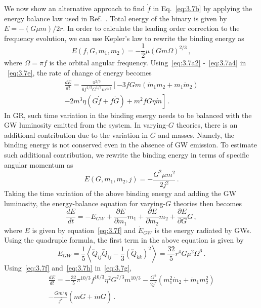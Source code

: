 \documentclass[prd,twocolumn,nofootinbib]{revtex4-1}
\begin{document}
 
We now show an alternative approach to find $\dot f$ in Eq.~\eqref{eq:3.7b} by applying the energy balance law used in Ref.~\cite{Yunes:2009bv}. Total energy of the binary is given by $E=-(G\mu m)/2r$. In order to calculate the leading order correction to the frequency evolution, we can use Kepler's law to rewrite the binding energy as 
 \begin{equation}\label{eq:3.7e}
 E(f,G,m_1,m_2)=-\frac{1}{2}\mu (Gm\Omega)^{2/3}\,,
 \end{equation}
 where $\Omega=\pi f$ is the orbital angular frequency. Using~\eqref{eq:3.7a2} -~\eqref{eq:3.7a4} in ~\eqref{eq:3.7e}, the rate of change of energy becomes
 \begin{align}\label{eq:3.7j}
 \frac{d E}{d t}=\frac{\pi^{2/3}}{6f^{1/3}G^{1/3}m^{4/3}}\left[-3fGm(\dot{m}_1m_2+m_1\dot{m}_2)\right.\nonumber\\ \left.-2m^3\eta(G\dot{f}+f\dot{G})+m^2fG\eta\dot{m}\right]\,.
 \end{align}
In GR, such time variation in the binding energy needs to be balanced with the GW luminosity emitted from the system. In varying-$G$ theories, there is an additional contribution due to the variation in $G$ and masses. Namely, the binding energy is not conserved even in the absence of GW emission. To estimate such additional contribution, we rewrite the binding energy in terms of specific angular momentum as
 \begin{equation}\label{eq:3.7f}
 E(G,m_1,m_2,j)=-\frac{G^2 \mu  m^2}{2 j^2}\,.
 \end{equation}
Taking the time variation of the above binding energy and adding the GW luminosity, the energy-balance equation for varying-$G$ theories then becomes
 \begin{equation}\label{eq:3.7g}
\frac{d E}{d t}=-\dot{E}_{GW}+\frac{\partial E}{\partial m_1}\dot{m_1}+\frac{\partial E}{\partial m_2}\dot{m_2}+\frac{\partial E}{\partial G}\dot{G}\,,
 \end{equation}
 where $E$ is given by equation~\eqref{eq:3.7f} and $\dot{E}_{GW}$ is the energy radiated by GWs. Using the quadruple formula, the first term in the above equation is given by
 \begin{equation}\label{eq:3.7h}
 \dot{E}_{GW}=\frac{1}{5}\left \langle\dddot{Q}_{ij}\dddot{Q}_{ij}-\frac{1}{3}(\dddot{Q}_{kk})^2\right \rangle=\frac{32}{5} r^4 G \mu ^2 \Omega ^6\,.
 \end{equation}
Using~\eqref{eq:3.7f} and~\eqref{eq:3.7h} in~\eqref{eq:3.7g},
 \begin{align}\label{eq:3.7i}
\frac{d E}{d t}=- \frac{32}{5} \pi ^{10/3} f^{10/3} \eta ^2 G^{7/3} m^{10/3}-\frac{G^2}{2j^2}(m_1^2\dot{m}_2+\dot{m}_1 m_2^2)\nonumber\\-\frac{Gm^2\eta}{j^2}(m\dot{G}+\dot{m}G)\,.
 \end{align}
\end{document}
